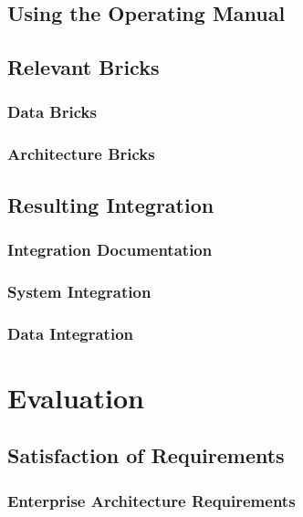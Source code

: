 \documentclass[
     12pt,         %
     a4paper,      %
     BCOR10mm,     %
     DIV14,        %
     ]{scrreprt}
\begin{document}
\subsection{Using the Operating Manual}

\subsection{Relevant Bricks}

\subsubsection{Data Bricks}

\subsubsection{Architecture Bricks}

\subsection{Resulting Integration}

\subsubsection{Integration Documentation}

\subsubsection{System Integration}

\subsubsection{Data Integration}

\section{Evaluation}

\subsection{Satisfaction of Requirements}

\subsubsection{Enterprise Architecture Requirements}
\end{document}
